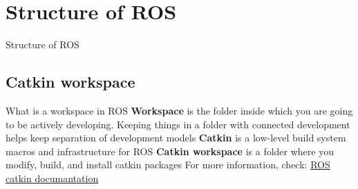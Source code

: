 \documentclass{beamer}
\begin{document}


\section{Structure of ROS}
\begin{frame}
\begin{center}
\Huge Structure of ROS
\end{center}
\end{frame}

\subsection{Catkin workspace}
\begin{frame}{What is a workspace in ROS}
\textbf{Workspace} is the folder inside which you are going to be actively developing. Keeping things in a folder with connected development helps keep separation of development models
\vfill
\textbf{Catkin} is a low-level build system macros and infrastructure for ROS
\vfill
\textbf{Catkin workspace} is a folder where you modify, build, and install catkin packages
\vfill
For more information, check: \href{http://wiki.ros.org/catkin}{ROS catkin documantation}
\end{frame}
\end{document}
